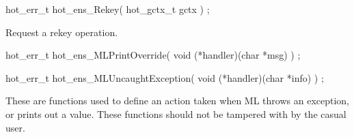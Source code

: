 \begin{codebox}
hot_err_t hot_ens_Rekey(
  hot_gctx_t gctx
) ;
\end{codebox}
Request a rekey operation. 

\begin{codebox}
hot_err_t hot_ens_MLPrintOverride(
  void (*handler)(char *msg)
) ;

hot_err_t hot_ens_MLUncaughtException(
  void (*handler)(char *info)
) ;
\end{codebox}
These are functions used to define an action taken when ML throws an
exception, or prints out a value. These functions should not be
tampered with by the casual user. 


